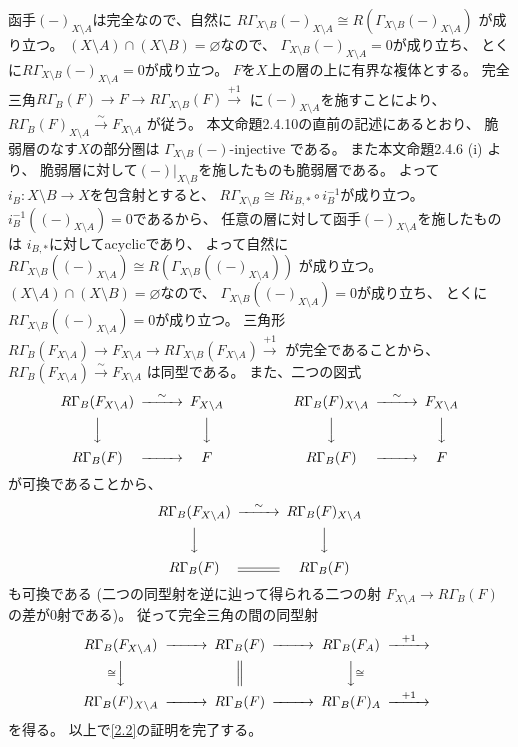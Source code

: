 \documentclass[uplatex,dvipdfmx]{jsarticle}
\makeatletter
\theoremstyle{definition}
\renewenvironment{proof}[1][\proofname]{
  \pushQED{\qed}%
  \normalfont \topsep6\p@\@plus6\p@\relax
  \trivlist
  \item[\hskip\labelsep
    #1\@addpunct{\textbf{.}}]\ignorespaces
}{%
  \popQED\endtrivlist\@endpefalse
}
\providecommand{\proofname}{証明}
\renewcommand{\emptyset}{\varnothing}
\makeatother
\begin{document}
\begin{proof}
  函手\((-)_{X\setminus A}\)は完全なので、自然に
  \(R\Gamma_{X\setminus B}(-)_{X\setminus A}\cong
  R(\Gamma_{X\setminus B}(-)_{X\setminus A})\)
  が成り立つ。
  \((X\setminus A)\cap (X\setminus B) = \emptyset\)なので、
  \(\Gamma_{X\setminus B}(-)_{X\setminus A}=0\)が成り立ち、
  とくに\(R\Gamma_{X\setminus B}(-)_{X\setminus A}=0\)が成り立つ。
  \(F\)を\(X\)上の層の上に有界な複体とする。
  完全三角\(R\Gamma_B(F) \to F\to R\Gamma_{X\setminus B}(F)\xrightarrow{+1}\)
  に\((-)_{X\setminus A}\)を施すことにより、
  \(R\Gamma_B(F)_{X\setminus A}\xrightarrow{\sim}F_{X\setminus A}\)
  が従う。
  本文命題2.4.10の直前の記述にあるとおり、
  脆弱層のなす\(X\)の部分圏は
  \(\Gamma_{X\setminus B}(-)\)-injective
  である。
  また本文命題2.4.6 (i) より、
  脆弱層に対して\((-)|_{X\setminus B}\)を施したものも脆弱層である。
  よって\(i_B:X\setminus B\to X\)を包含射とすると、
  \(R\Gamma_{X\setminus B} \cong Ri_{B,*}\circ i_B^{-1}\)が成り立つ。
  \(i_B^{-1}((-)_{X\setminus A}) = 0\)であるから、
  任意の層に対して函手\((-)_{X\setminus A}\)を施したものは
  \(i_{B,*}\)に対してacyclicであり、
  よって自然に
  \(R\Gamma_{X\setminus B}((-)_{X\setminus A}) \cong
  R(\Gamma_{X\setminus B}((-)_{X\setminus A}))\)
  が成り立つ。
  \((X\setminus A)\cap (X\setminus B) = \emptyset\)なので、
  \(\Gamma_{X\setminus B}((-)_{X\setminus A}) = 0\)が成り立ち、
  とくに\(R\Gamma_{X\setminus B}((-)_{X\setminus A}) = 0\)が成り立つ。
  三角形
  \(R\Gamma_B(F_{X\setminus A})\to F_{X\setminus A}\to
  R\Gamma_{X\setminus B}(F_{X\setminus A})\xrightarrow{+1}\)
  が完全であることから、
  \(R\Gamma_B(F_{X\setminus A})\xrightarrow{\sim} F_{X\setminus A}\)
  は同型である。
  また、二つの図式
  \[
  \begin{CD}
    R\Gamma_B(F_{X\setminus A}) @>\sim>> F_{X\setminus A} @. \ \ \ \ \  @.
    R\Gamma_B(F)_{X\setminus A} @>\sim>> F_{X\setminus A} \\
    @VVV @VVV @. @VVV @VVV \\
    R\Gamma_B(F) @>>> F @. \ \ \ \ \ \ \ \ \ \ \ \ \ \ \ @. R\Gamma_B(F) @>>> F
  \end{CD}
  \]
  が可換であることから、
  \[
  \begin{CD}
    R\Gamma_B(F_{X\setminus A}) @>\sim>> R\Gamma_B(F)_{X\setminus A} \\
    @VVV @VVV  \\
    R\Gamma_B(F) @= R\Gamma_B(F)
  \end{CD}
  \]
  も可換である
  (二つの同型射を逆に辿って得られる二つの射
  \(F_{X\setminus A}\to R\Gamma_B(F)\)の差が\(0\)射である)。
  従って完全三角の間の同型射
  \[
  \begin{CD}
    R\Gamma_B(F_{X\setminus A}) @>>> R\Gamma_B(F) @>>> R\Gamma_B(F_A) @> +1 >> \\
    @V \cong VV @| @VV \cong V @. \\
    R\Gamma_B(F)_{X\setminus A} @>>> R\Gamma_B(F) @>>> R\Gamma_B(F)_A @> +1 >>
  \end{CD}
  \]
  を得る。
  以上で\autoref{2.2}の証明を完了する。
\end{proof}
\end{document}
